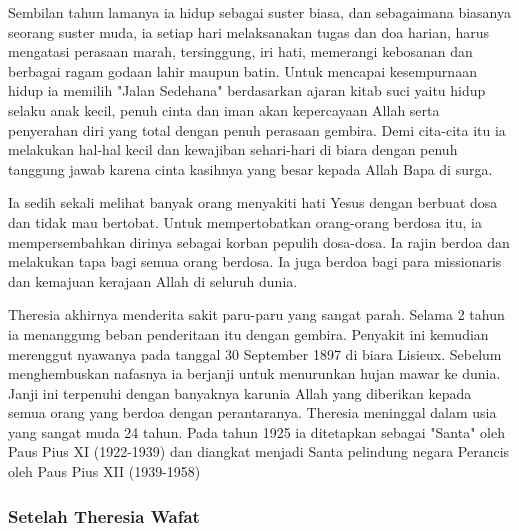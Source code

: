 Sembilan tahun lamanya ia hidup sebagai suster biasa, dan sebagaimana biasanya seorang suster muda, ia setiap hari melaksanakan tugas dan doa harian, harus mengatasi perasaan marah, tersinggung, iri hati, memerangi kebosanan dan berbagai ragam godaan lahir maupun batin. Untuk mencapai kesempurnaan hidup ia memilih "Jalan Sedehana" berdasarkan ajaran kitab suci yaitu hidup selaku anak kecil, penuh cinta dan iman akan kepercayaan Allah serta penyerahan diri yang total dengan penuh perasaan gembira. Demi cita-cita itu ia melakukan hal-hal kecil dan kewajiban sehari-hari di biara dengan penuh tanggung jawab karena cinta kasihnya yang besar kepada Allah Bapa di surga.

Ia sedih sekali melihat banyak orang menyakiti hati Yesus dengan berbuat dosa dan tidak mau bertobat. Untuk mempertobatkan orang-orang berdosa itu, ia mempersembahkan dirinya sebagai korban pepulih dosa-dosa. Ia rajin berdoa dan melakukan tapa bagi semua orang berdosa. Ia juga berdoa bagi para missionaris dan kemajuan kerajaan Allah di seluruh dunia.

Theresia akhirnya menderita sakit paru-paru yang sangat parah. Selama 2 tahun ia menanggung beban penderitaan itu dengan gembira. Penyakit ini kemudian merenggut nyawanya pada tanggal 30 September 1897 di biara Lisieux. Sebelum menghembuskan nafasnya ia berjanji untuk menurunkan hujan mawar ke dunia. Janji ini terpenuhi dengan banyaknya karunia Allah yang diberikan kepada semua orang yang berdoa dengan perantaranya. Theresia meninggal dalam usia yang sangat muda 24 tahun. Pada tahun 1925 ia ditetapkan sebagai "Santa" oleh Paus Pius XI (1922-1939) dan diangkat menjadi Santa pelindung negara Perancis oleh Paus Pius XII (1939-1958)

\subsubsection*{Setelah Theresia Wafat}

